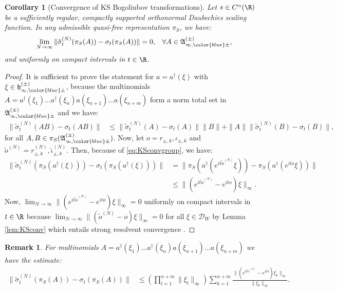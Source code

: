 \documentclass[a4paper, 11pt]{article}
\newcommand{\fA}{\mathfrak{A}}\newcommand{\cA}{\mathcal{A}}\newcommand{\dA}{\mathds{A}}\newcommand{\sA}{\mathscr{A}}
\newcommand{\fh}{\mathfrak{h}}
\DeclareMathOperator{\1}{\mathds{1}}
\newtheorem{cor}[thm]{Corollary}
\newtheorem{rem}[thm]{Remark}
\begin{document}
\begin{cor}[Convergence of KS Bogoliubov transformations]
\label{cor:KSconvbog}
Let $s\in C^{\alpha}(\R)$ be a sufficiently regular, compactly supported orthonormal Daubechies scaling function. In any admissible quasi-free representation $\pi_{S}$, we have:
\begin{align*}
\lim_{N\rightarrow\infty}\|\tilde{\sigma}^{(N)}_{t}(\pi_{S}(A)) - \sigma_{t}(\pi_{S}(A))\| & = 0, & \forall A\in\fA^{(\pm)}_{\infty,{\color{blue}\pm}},
\end{align*}
and uniformly on compact intervals in $t\in\R$.
\end{cor}
\begin{proof}
It is sufficient to prove the statement for $a = a^{\dagger}(\xi)$ with $\xi\in\fh^{(\pm)}_{\infty,{\color{blue}\pm}}$, because the multinomials $A = a^{\dagger}(\xi_{1})\dots a^{\dagger}(\xi_{n})a(\xi_{n+1})\dots a(\xi_{n+m})$ form a norm total set in $\fA^{(\pm)}_{\infty,{\color{blue}\pm}}$ and we have:
\begin{align*}
\|\tilde{\sigma}^{(N)}_{t}(AB) - \sigma_{t}(AB)\| & \leq \|\tilde{\sigma}^{(N)}_{t}(A)-\sigma_{t}(A)\|\|B\| +\|A\|\|\tilde{\sigma}^{(N)}_{t}(B)-\sigma_{t}(B)\|,
\end{align*}
for all $A,B\in\pi_{S}(\fA^{(\pm)}_{\infty,{\color{blue}\pm}})$. Now, let $o = r_{\pm,k}, \iota_{\pm,k}$ and $\tilde{o}^{(N)} = r^{(N)}_{\pm,k}, \tilde{\iota}^{(N)}_{\pm,k}$. Then, because of \eqref{eq:KSconvgroup}, we have:
\begin{align*}
\|\tilde{\sigma}^{(N)}_{t}(\pi_{S}(a^{\dagger}(\xi))) - \sigma_{t}(\pi_{S}(a^{\dagger}(\xi)))\| & = \|\pi_{S}(a^{\dagger}(e^{it \tilde{o}^{(N)}}\xi)) - \pi_{S}(a^{\dagger}(e^{ito}\xi))\|\\
& \leq \|(e^{it \tilde{o}^{(N)}} - e^{it o})\xi\|_{\infty}.
\end{align*}
Now, $\lim_{N\rightarrow\infty}\|(e^{it \tilde{o}^{(N)}} - e^{it o})\xi\|_{\infty} = 0$ uniformly on compact intervals in $t\in\R$ because $\lim_{N\rightarrow\infty}\|(\tilde{o}^{(N)} - o)\xi\|_{\infty} = 0$ for all $\xi\in\mathcal{D}_{W}$ by Lemma \ref{lem:KSconv} which entails strong resolvent convergence \cite{ReedMethodsOfModern1}.
\end{proof}

\begin{rem}
\label{rem:KSunitaryconv}
For multinomials $A = a^{\dagger}(\xi_{1})\dots a^{\dagger}(\xi_{n})a(\xi_{n+1})\dots a(\xi_{n+m})$ we have the estimate:
\begin{align}
\label{eq:KSmultiestimate}
\|\tilde{\sigma}^{(N)}_{t}(\pi_{S}(A)) - \sigma_{t}(\pi_{S}(A))\| & \leq \left(\prod_{l=1}^{n+m}\|\xi_{l}\|_{\infty}\right)\sum_{k=1}^{n+m}\frac{\|(e^{it \tilde{o}^{(N)}} - e^{it o})\xi_{k}\|_{\infty}}{\|\xi_{k}\|_{\infty}}.
\end{align}
\end{rem}
\end{document}
